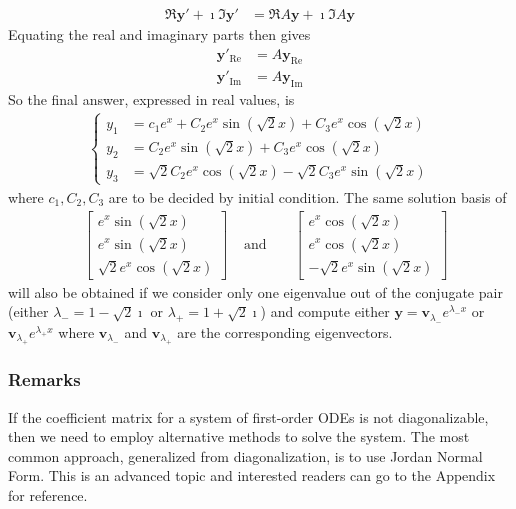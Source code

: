 \begin{solution}
\begin{align*}
\Re{\textbf{y}'} + \imath\Im{\textbf{y}'} &= \Re{A\textbf{y}} + \imath \Im{A\textbf{y}}
\end{align*}
Equating the real and imaginary parts then gives
\begin{align*}
\textbf{y}'_{\text{Re}} &= A\textbf{y}_{\text{Re}} \\
\textbf{y}'_{\text{Im}} &= A\textbf{y}_{\text{Im}}
\end{align*}
So the final answer, expressed in real values, is
\begin{align*}
\begin{cases}
y_1 &= c_1e^x + C_2e^{x}\sin(\sqrt{2}x) + C_3e^{x}\cos(\sqrt{2}x) \\
y_2 &= C_2e^{x}\sin(\sqrt{2}x) + C_3e^{x}\cos(\sqrt{2}x) \\
y_3 &= \sqrt{2}C_2e^{x}\cos(\sqrt{2}x) - \sqrt{2}C_3e^{x}\sin(\sqrt{2}x)
\end{cases}
\end{align*}
where $c_1, C_2, C_3$ are to be decided by initial condition. The same solution basis of 
\begin{align*}
&\begin{bmatrix}
e^{x}\sin(\sqrt{2}x) \\
e^{x}\sin(\sqrt{2}x) \\
\sqrt{2}e^{x}\cos(\sqrt{2}x)
\end{bmatrix}
& \text{ and } &
&\begin{bmatrix}
e^{x}\cos(\sqrt{2}x) \\
e^{x}\cos(\sqrt{2}x) \\
-\sqrt{2}e^{x}\sin(\sqrt{2}x)
\end{bmatrix}
\end{align*}
will also be obtained if we consider only one eigenvalue out of the conjugate pair (either $\lambda_{-} = 1-\sqrt{2}\imath$ or $\lambda_{+} = 1+\sqrt{2}\imath$) and compute either $\textbf{y} = \textbf{v}_{\lambda_{-}}e^{\lambda_{-} x}$ or $\textbf{v}_{\lambda_{+}}e^{\lambda_{+} x}$ where $\textbf{v}_{\lambda_{-}}$ and $\textbf{v}_{\lambda_{+}}$ are the corresponding eigenvectors. 
\end{solution}

\subsubsection{Remarks} If the coefficient matrix for a system of first-order ODEs is not diagonalizable, then we need to employ alternative methods to solve the system. The most common approach, generalized from diagonalization, is to use Jordan Normal Form. This is an advanced topic and interested readers can go to the Appendix for reference.

